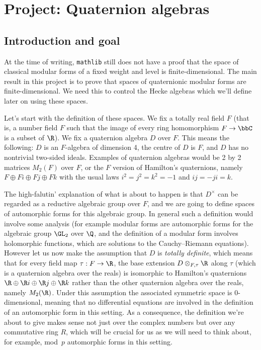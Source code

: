 \chapter{Project: Quaternion algebras}\label{Quat_alg_project}

\section{Introduction and goal}

At the time of writing, {\tt mathlib} still does not have a proof that the space
of classical modular forms of a fixed weight and level is finite-dimensional. The main result
in this project is to prove that spaces of quaternionic modular forms are
finite-dimensional. We need this to control the Hecke algebras which we'll define
later on using these spaces.

Let's start with the definition of these spaces. We fix a totally real field $F$
(that is, a number field $F$ such that the image of every ring homomorphism $F\to\bbC$
is a subset of $\R$). We fix a quaternion algebra $D$ over $F$. This means
the following: $D$ is an $F$-algebra of dimension 4, the centre of $D$ is $F$,
and $D$ has no nontrivial two-sided ideals. Examples of quaternion algebras
would be 2 by 2 matrices $M_2(F)$ over $F$, or the $F$ version of Hamilton's quaternions,
namely $F\oplus Fi\oplus Fj\oplus Fk$ with the usual laws $i^2=j^2=k^2=-1$ and
$ij=-ji=k$.

The high-falutin' explanation of what is about to happen is that $D^\times$
can be regarded as a reductive algebraic group over $F$, and we are going to define spaces
of automorphic forms for this algebraic group. In general such a definition would
involve some analysis (for example modular forms are automorphic forms for the
algebraic group $\GL_2$ over $\Q$, and the definition of a modular form involves
holomorphic functions, which are solutions to the Cauchy--Riemann equations).
However let us now make the assumption that $D$ is
\emph{totally definite}, which means that for every field map $\tau:F\to\R$,
the base extension $D\otimes_{F,\tau}\R$ along $\tau$ (which is a quaternion algebra
over the reals) is isomorphic to Hamilton's quaternions
$\R\oplus \R i\oplus\R j\oplus\R k$ rather than the other quaternion algebra
over the reals, namely $M_2(\R)$. Under this assumption the associated symmetric space
is 0-dimensional, meaning that no differential equations are involved in the definition
of an automorphic form in this setting. As a consequence, the definition we're about to give
makes sense not just over the complex numbers but over any commutative ring $R$, which will
be crucial for us as we will need to think about, for example, mod~$p$ automorphic forms in this
setting.

